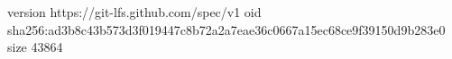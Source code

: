version https://git-lfs.github.com/spec/v1
oid sha256:ad3b8c43b573d3f019447c8b72a2a7eae36c0667a15ec68ce9f39150d9b283e0
size 43864
